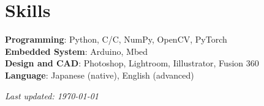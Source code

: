 \documentclass[letterpaper,11pt]{article}
\begin{document}
\section{Skills}
\small{
    \textbf{Programming}: Python, C/{C\nolinebreak[4]\hspace{-.05em}\raisebox{.4ex}{\tiny\bf ++}}, NumPy, OpenCV, PyTorch \\
    \textbf{Embedded System}: Arduino, Mbed \\
    \textbf{Design and CAD}: Photoshop, Lightroom, Iillustrator, Fusion 360 \\
    \textbf{Language}: Japanese (native), English (advanced)
}


\vspace{5pt}
\begin{flushright}
    {\small\textit{Last updated: \today}}
\end{flushright}
\end{document}
